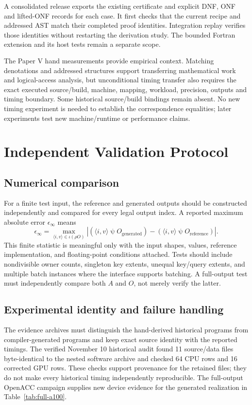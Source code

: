 \documentclass[sigplan,10pt,review,balance=false,pbalance=false]{acmart}
\newcommand{\ps}{\mathbin{\psi}}
\begin{document}
A consolidated release exports the existing certificate and explicit DNF, ONF and lifted-ONF records for each case. It first checks that the current recipe and addressed AST match their completed proof identities. Integration replay verifies those identities without restarting the derivation study. The bounded Fortran extension and its host tests remain a separate scope.

The Paper V hand measurements provide empirical context. Matching denotations and addressed structures support transferring mathematical work and logical-access analysis, but unconditional timing transfer also requires the exact executed source/build, machine, mapping, workload, precision, outputs and timing boundary. Some historical source/build bindings remain absent. No new timing experiment is needed to establish the correspondence equalities; later experiments test new machine/runtime or performance claims.

\section{Independent Validation Protocol}
\subsection{Numerical comparison}
For a finite test input, the reference and generated outputs should be constructed independently and compared for every legal output index. A reported maximum absolute error $\epsilon_\infty$ means
\begin{equation}
 \epsilon_\infty=\max_{\langle i,v\rangle\in\iota(\rho O)}
 \left| (\langle i,v\rangle\ps O_{\mathrm{generated}})-
 (\langle i,v\rangle\ps O_{\mathrm{reference}})\right|.
\end{equation}
This finite statistic is meaningful only with the input shapes, values, reference implementation, and floating-point conditions attached. Tests should include nondivisible owner counts, singleton key extents, unequal key/query extents, and multiple batch instances where the interface supports batching. A full-output test must independently compare both $A$ and $O$, not merely verify the latter.

\subsection{Experimental identity and failure handling}
The evidence archives must distinguish the hand-derived historical programs from compiler-generated programs and keep exact source identity with the reported timings. The verified November 10 historical audit found 11 source/data files byte-identical to the nested software archive and checked 64 CPU rows and 16 corrected GPU rows. These checks support provenance for the retained files; they do not make every historical timing independently reproducible. The full-output OpenACC campaign supplies new device evidence for the generated realization in Table~\ref{tab:full-a100}.
\end{document}

